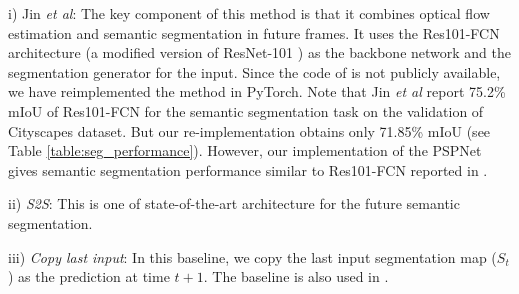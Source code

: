 \documentclass{bmvc2k}
\def\etal{\emph{et al}\bmvaOneDot}
\begin{document}
i) Jin \etal\cite{jin2017predicting}: The key component of this method is that it combines optical flow estimation and semantic segmentation in future frames. It uses the Res101-FCN architecture (a modified version of ResNet-101 \cite{he2016deep}) as the backbone network and the segmentation generator for the input. Since the code of \cite{jin2017predicting} is not publicly available, we have reimplemented the method in PyTorch. Note that Jin \etal\cite{jin2017predicting} report 75.2\% mIoU of Res101-FCN for the semantic segmentation task on the validation of Cityscapes dataset. But our re-implementation obtains only 71.85\% mIoU (see Table \ref{table:seg_performance}). However, our implementation of the PSPNet gives semantic segmentation performance similar to Res101-FCN reported in \cite{jin2017predicting}. 
 
ii) \textit{S2S}\cite{NextSegmPredICCV17}: This is one of state-of-the-art architecture for the future semantic segmentation. 

iii) \textit{Copy last input}: In this baseline, we copy the last input segmentation map ($S_{t}$) as the prediction at time $t+1$. The baseline is also used in  \cite{jin2017predicting}.
\end{document}

